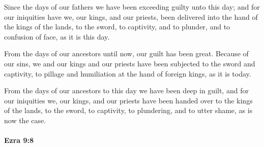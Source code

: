 			\begin{versebox}
					\item[BHS] 
					\item[LXX] 
					\item[ASV] Since the days of our fathers we have been exceeding guilty unto this day; and for our iniquities have we, our kings, and our priests, been delivered into the hand of the kings of the lands, to the sword, to captivity, and to plunder, and to confusion of face, as it is this day.
					\item[NIV] From the days of our ancestors until now, our guilt has been great. Because of our sins, we and our kings and our priests have been subjected to the sword and captivity, to pillage and humiliation at the hand of foreign kings, as it is today.
					\item[NRSV] From the days of our ancestors to this day we have been deep in guilt, and for our iniquities we, our kings, and our priests have been handed over to the kings of the lands, to the sword, to captivity, to plundering, and to utter shame, as is now the case.
			\end{versebox}

		\paragraph{Ezra 9:8} %
			\label{EZRA-9-8}

